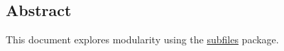 \subsection*{Abstract}
This document explores modularity using the \href{https://ctan.org/pkg/subfiles}{subfiles} package.
